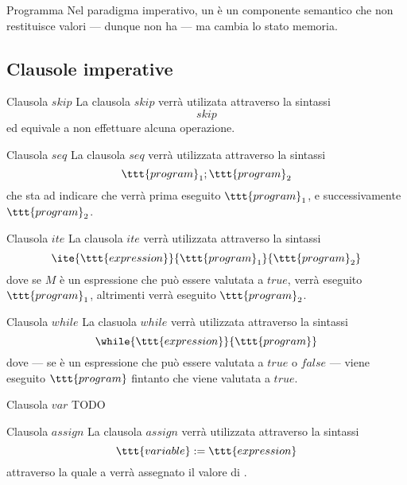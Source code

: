 \documentclass[a4paper, 12pt]{report}
\begin{document}
    \begin{frameddefn}{Programma}
        Nel paradigma imperativo, un  è un componente semantico che non restituisce valori --- dunque non ha  --- ma cambia lo stato memoria.
    \end{frameddefn}

    \subsection{Clausole imperative}

    \begin{frameddefn}{Clausola $skip$}
        La clausola $skip$ verrà utilizata attraverso la sintassi $$skip$$ ed equivale a non effettuare alcuna operazione.
    \end{frameddefn}
    
    \begin{frameddefn}{Clausola $seq$}
        La clausola $seq$ verrà utilizzata attraverso la sintassi $$\ttt{program}_1;\ttt{program}_2$$ che sta ad indicare che verrà prima eseguito $\ttt{program}_1$, e successivamente $\ttt{program}_2$.
    \end{frameddefn}

    \begin{frameddefn}{Clausola $ite$}
        La clausola $ite$ verrà utilizzata attraverso la sintassi $$\ite{\ttt{expression}}{\ttt{program}_1}{\ttt{program}_2}$$ dove se $M$ è un espressione che può essere valutata a $true$, verrà eseguito $\ttt{program}_1$, altrimenti verrà eseguito $\ttt{program}_2$.
    \end{frameddefn}

    \begin{frameddefn}{Clausola $while$}
        La clasuola $while$ verrà utilizzata attraverso la sintassi $$\while{\ttt{expression}}{\ttt{program}}$$ dove --- se  è un espressione che può essere valutata a $true$ o $false$ --- viene eseguito $\ttt{program}$ fintanto che  viene valutata a $true$.
    \end{frameddefn}

    \begin{frameddefn}{Clausola $var$}
        TODO
    \end{frameddefn}

    \begin{frameddefn}{Clausola $assign$}
        La clausola $assign$ verrà utilizzata attraverso la sintassi $$\ttt{variable}  := \ttt{expression}$$ attraverso la quale a  verrà assegnato il valore di .
    \end{frameddefn}
\end{document}
